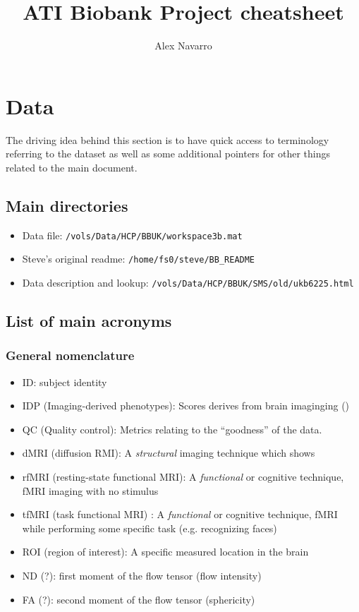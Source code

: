\documentclass{article}
\begin{document}
\title{ATI Biobank Project cheatsheet}

\author{Alex Navarro}

\maketitle

\section{Data\label{sec:data}}
The driving idea behind this section is to have quick access to terminology referring to the dataset as well as some additional pointers for other things related to the main document.

\subsection{Main directories\label{sec:data-dir}}

\begin{itemize}
\item Data file: {\tt /vols/Data/HCP/BBUK/workspace3b.mat}
\item Steve's original readme: {\tt /home/fs0/steve/BB\_README}
\item Data description and lookup: {\tt /vols/Data/HCP/BBUK/SMS/old/ukb6225.html}
\end{itemize}

\subsection{List of main acronyms\label{sec:data-acro}}

\subsubsection{General nomenclature}
\begin{itemize}
\item ID: subject identity
\item IDP (Imaging-derived phenotypes): Scores derives from brain imaginging ()
\item QC (Quality control): Metrics relating to the ``goodness'' of the data.
\item dMRI (diffusion RMI): A \emph{structural} imaging technique which shows
\item rfMRI (resting-state functional MRI): A \emph{functional} or cognitive technique, fMRI imaging with no stimulus
\item tfMRI (task functional MRI) : A \emph{functional} or cognitive technique, fMRI while performing some specific task (e.g. recognizing faces)
\item ROI (region of interest): A specific measured location in the brain
\item ND (?): first moment of the flow tensor (flow intensity)
\item FA (?): second moment of the flow tensor (sphericity)
\end{itemize}
\end{document}
